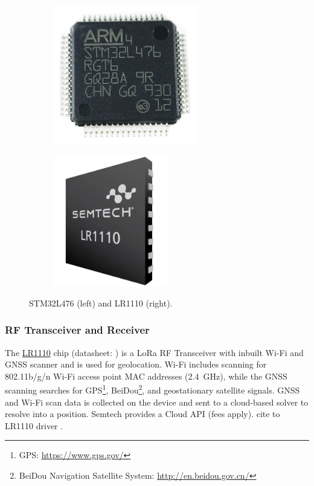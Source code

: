 \begin{figure}[H]
    \centering
    \begin{subfigure}{.45\textwidth}
      \centering
      \includegraphics[width=0.7\textwidth]{figures/STM32L476.jpg}
    \end{subfigure}
    \begin{subfigure}{.45\textwidth}
      \centering
      \includegraphics[width=0.55\textwidth]{figures/LR1110.png}
    \end{subfigure}
    \caption{STM32L476 (left) and LR1110 (right).}
    \label{fig:chips}
\end{figure}

\subsubsection{RF Transceiver and Receiver}
The \hyperref[bom:lr1110]{LR1110} chip (datasheet: ) is a \ac{LoRa} RF Transceiver with inbuilt Wi-Fi and \ac{GNSS} scanner and is used for geolocation. Wi-Fi includes scanning for 802.11b/g/n Wi-Fi access point \ac{MAC} addresses (\SI{2.4}{\giga\hertz}), while the \ac{GNSS} scanning searches for \ac{GPS}\footnote{GPS: \url{https://www.gps.gov/}}, BeiDou\footnote{BeiDou Navigation Satellite System: \url{http://en.beidou.gov.cn/}}, and geostationary satellite signals. \ac{GNSS} and Wi-Fi scan data is collected on the device and sent to a cloud-based solver to resolve into a position. Semtech provides a Cloud API (fees apply).
cite to LR1110 driver \cite{lr11xx_driver}.

